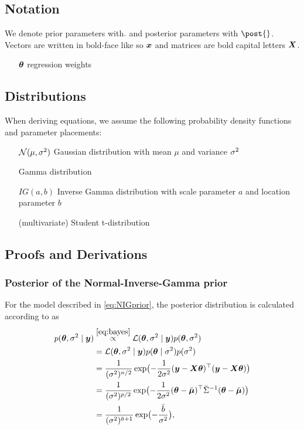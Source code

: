 \subsection*{Notation}

We denote prior parameters with $\breve{}$ and posterior parameters with $\post{}$. Vectors are written in bold-face like so $\bm{x}$ and matrices are bold capital letters $\bm{X}$.

\begin{itemize}
    \item[$\bm{\theta}$] regression weights
    \item[] 
\end{itemize}



\subsection*{Distributions}

When deriving equations, we assume the following probability density functions and parameter placements:

\begin{itemize}
    \item[$\mathcal{N}(\mu, \sigma^2)$] Gaussian distribution with mean $\mu$ and variance $\sigma^2$
    \item[] Gamma distribution
    \item[$IG(a, b)$] Inverse Gamma distribution with scale parameter $a$ and location parameter $b$
    \item[]  (multivariate) Student t-distribution
    \item[] 
\end{itemize}

\subsection*{Proofs and Derivations}

\subsubsection*{Posterior of the Normal-Inverse-Gamma prior}
For the model described in \eqref{eq:NIGprior}, the posterior distribution is calculated according to \citet{fahrmeir_regression_2021} as
\begin{equation*}
    \begin{aligned}
        p(\bm{\theta}, \sigma^2 \mid \bm{y}) &\overset{\eqref{eq:bayes}}{\propto} \mathcal{L}(\bm{\theta}, \sigma^2 \mid \bm{y}) p(\bm{\theta}, \sigma^2) \\
        &= \mathcal{L}(\bm{\theta}, \sigma^2 \mid \bm{y}) p(\bm{\theta} \mid \sigma^2) p(\sigma^2) \\
        &= \frac{1}{(\sigma^2)^{n/2}} \exp\bigl( - \frac{1}{2\sigma^2} (\bm{y} - \bm{X} \bm{\theta})^\top(\bm{y} - \bm{X} \bm{\theta}) \bigr)\\
        &= \frac{1}{(\sigma^2)^{p/2}} \exp\bigl( - \frac{1}{2\sigma^2} (\bm{\theta} - \breve{\bm{\mu}})^\top \breve{\Sigma}^{-1} (\bm{\theta} - \breve{\bm{\mu}}) \bigr)\\
        &= \frac{1}{(\sigma^2)^{\breve{a} + 1}} \exp\bigl( - \frac{\breve{b}}{\sigma^2} \bigr),
    \end{aligned}
\end{equation*}

